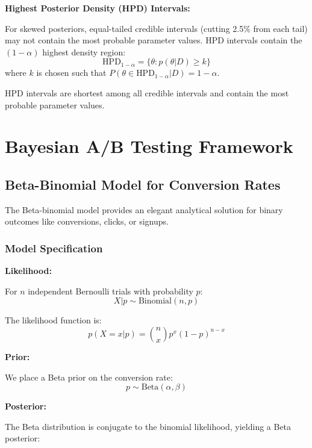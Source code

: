 \textbf{Highest Posterior Density (HPD) Intervals:}

For skewed posteriors, equal-tailed credible intervals (cutting 2.5\% from each tail) may not contain the most probable parameter values. HPD intervals contain the $(1-\alpha)$ highest density region:
\begin{equation}
\text{HPD}_{1-\alpha} = \{\theta : p(\theta | D) \geq k\}
\end{equation}
where $k$ is chosen such that $P(\theta \in \text{HPD}_{1-\alpha} | D) = 1-\alpha$.

HPD intervals are shortest among all credible intervals and contain the most probable parameter values.

\section{Bayesian A/B Testing Framework}

\subsection{Beta-Binomial Model for Conversion Rates}

The Beta-binomial model provides an elegant analytical solution for binary outcomes like conversions, clicks, or signups.

\subsubsection{Model Specification}

\textbf{Likelihood:}

For $n$ independent Bernoulli trials with probability $p$:
\begin{equation}
X | p \sim \text{Binomial}(n, p)
\end{equation}

The likelihood function is:
\begin{equation}
p(X = x | p) = \binom{n}{x} p^x (1-p)^{n-x}
\end{equation}

\textbf{Prior:}

We place a Beta prior on the conversion rate:
\begin{equation}
p \sim \text{Beta}(\alpha, \beta)
\end{equation}

\textbf{Posterior:}

The Beta distribution is conjugate to the binomial likelihood, yielding a Beta posterior:

